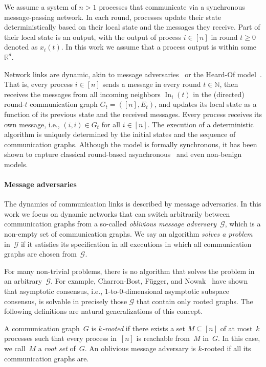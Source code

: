 \documentclass[a4paper,USenglish]{lipics-v2021}
\newcommand{\N}{\mathcal{G}}
\newcommand{\IR}{\mathbb{R}}
\newcommand{\IN}{\mathbb{N}}
\renewcommand{\geq}{\geqslant}
\DeclareMathOperator\In{In}
\begin{document}
We assume a system of $n > 1$ processes that communicate via a synchronous message-passing network.
In each round, processes update their state deterministically based on their local state and the
messages they receive.
Part of their local state is an output, with the output of process $i \in [n]$ in round $t \geq 0$ denoted as $x_i(t)$.
In this work we assume that a process output is within some $\IR^d$.

Network links are dynamic, akin to message adversaries~\cite{afek13:asynchrony} or the Heard-Of
model~\cite{charron09:HO}.
That is, every process $i\in[n]$ sends a message in every round $t\in\IN$,
then receives the messages from all incoming neighbors $\In_i(t)$ in the (directed)
round-$t$ communication graph $G_t=([n],E_t)$, and updates its local state as a function
of its previous state and the received messages.
Every process receives its own message, i.e., $(i,i)\in G_t$ for all $i\in[n]$.
The execution of a deterministic algorithm is uniquely determined by the
initial states and the sequence of communication graphs.
Although the model is formally synchronous, it has been shown to capture
classical round-based asynchronous~\cite{charron09:HO} and even non-benign~\cite{biely07:tolerating,mendes15:multidimensional} models.


\paragraph*{Message adversaries}

The dynamics of communication links is described by message adversaries.
In this work we focus on dynamic networks that can switch arbitrarily between communication graphs from a so-called \emph{oblivious message adversary}~$\N$, which is a non-empty set of communication graphs.
We say an algorithm \emph{solves a problem} in~$\N$ if it satisfies its specification in all executions in which all communication graphs are chosen from~$\N$.

For many non-trivial problems, there is no algorithm that solves the problem in an arbitrary~$\N$.
For example, Charron-Bost, Függer, and Nowak~\cite{CBFN15:icalp} have shown that asymptotic consensus,
i.e., 1-to-0-dimensional asymptotic subspace consensus, is
solvable in precisely those $\N$ that contain only rooted graphs.
The following definitions are natural generalizations of this concept.

A communication graph~$G$ is \emph{$k$-rooted} if there exists a set
$M\subseteq[n]$ of at most~$k$ processes such that every process in~$[n]$
is reachable from~$M$ in~$G$.
In this case, we call~$M$ a \emph{root set} of~$G$.
An oblivious message adversary is $k$-rooted if all its communication graphs are.
\end{document}
